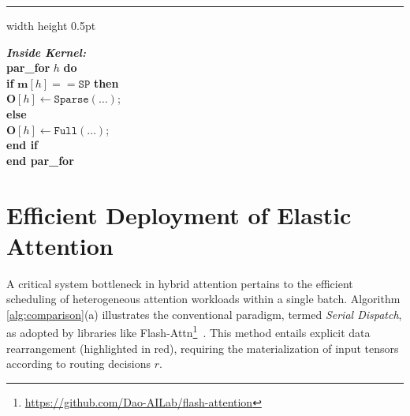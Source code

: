 \begin{algorithm}[t]
\begin{minipage}[t]{0.48\textwidth}
\begin{algorithmic}[1]
{                \vspace{0.3em}
                \hrule width \linewidth height 0.5pt \vspace{0.2em}
                
                \textbf{\textit{Inside Kernel:}} \\
                \textbf{par\_for} $h$ \textbf{do} \\
                \hspace*{1em} \textbf{if} $\mathbf{m}[h] {==} \texttt{SP}$ \textbf{then} \\
                \hspace*{2em} $\mathbf{O}[h] \leftarrow \texttt{Sparse}(\dots)$; \\
                \hspace*{1em} \textbf{else} \\
                \hspace*{2em} $\mathbf{O}[h] \leftarrow \texttt{Full}(\dots)$; \\
                \hspace*{1em} \textbf{end if} \\
                \textbf{end par\_for}
            }
        \end{algorithmic}
    \end{minipage}
\end{algorithm}
\section{Efficient Deployment of Elastic Attention}
\label{appdix:deployment}


A critical system bottleneck in hybrid attention pertains to the efficient scheduling of heterogeneous attention workloads within a single batch. Algorithm \ref{alg:comparison}(a) illustrates the conventional paradigm, termed \textit{Serial Dispatch}, as adopted by libraries like Flash-Attn\footnote{\url{https://github.com/Dao-AILab/flash-attention}}~\citep{dao2023flashattention2}. This method entails explicit data rearrangement (highlighted in red), requiring the materialization of input tensors according to routing decisions $r$. 


